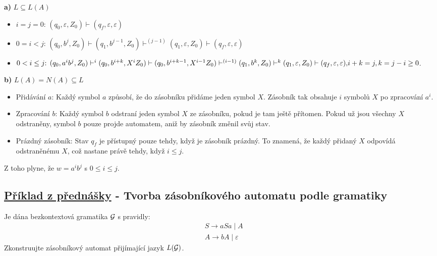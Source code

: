\textbf{a)} $L \subseteq L(A)$
\begin{itemize}[leftmargin=*]
    \item $i=j=0 \text{: } (q_0, \varepsilon, Z_0) \vdash (q_f, \varepsilon, \varepsilon)$
    \item $0=i < j \text{: } (q_0, b^j, Z_0) \vdash (q_1, b^{j-1}, Z_0) \vdash^{(j-1)} (q_1, \varepsilon, Z_0) 
    \vdash (q_f, \varepsilon, \varepsilon)$
    \item ${0<i \leq j \text{: } (q_0, a^i b^j, Z_0) \vdash^i (q_0, b^{i+k}, X^i Z_0) \vdash (q_0, b^{i+k-1}, X^{i-1} Z_0)
    \vdash^{(i-1)} (q_1, b^k, Z_0) \vdash^k (q_1, \varepsilon, Z_0) \vdash (q_f, \varepsilon, \varepsilon),}\\
    i+k = j, k=j-i \geq 0$.
\end{itemize}
\textbf{b)} $L(A) = N(A) \subseteq L$
\begin{itemize}[leftmargin=*,noitemsep]
    \item Přidávání $a$:
    Každý symbol $a$ způsobí, že do zásobníku přidáme jeden symbol $X$. Zásobník tak obsahuje $i$ symbolů $X$ po 
    zpracování $a^i$.
    \item Zpracování $b$:
    Každý symbol $b$ odstraní jeden symbol $X$ ze zásobníku, pokud je tam ještě přítomen. Pokud už jsou všechny $X$ 
    odstraněny, symbol $b$ pouze projde automatem, aniž by zásobník změnil svůj stav.
    \item Prázdný zásobník:
    Stav $q_f$ je přístupný pouze tehdy, když je zásobník prázdný. To znamená, že každý přidaný $X$ odpovídá 
    odstraněnému $X$, což nastane právě tehdy, když $i \leq j$.
\end{itemize}
Z toho plyne, že $w = a^i b^j$ s $0 \leq i \leq j$.

\subsection{\href{https://youtu.be/9zpbNd1Yqnc?list=PLQL6z4JeTTQkLuzI78OTnfYBclE1g0UjS&t=1621}{Příklad z přednášky} - Tvorba zásobníkového automatu podle gramatiky} %
Je dána bezkontextová gramatika $\mathcal{G}$ s pravidly:
\begin{align*}
    &S \rightarrow aSa \mid A \\
    &A \rightarrow bA \mid \varepsilon
\end{align*}
Zkonstruujte zásobníkový automat přijímající jazyk $L(\mathcal{G})$.
